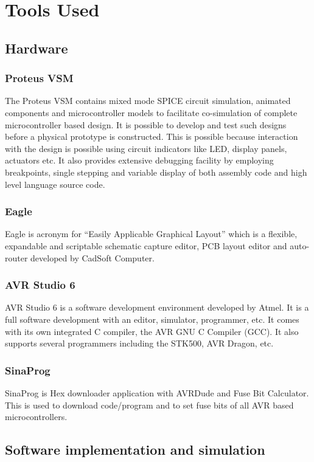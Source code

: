 \documentclass[12pt, a4paper]{article}
\begin{document}
\newpage
\section{Tools Used}

\subsection{ Hardware}
\subsubsection{Proteus VSM}
The Proteus VSM contains mixed mode SPICE circuit simulation, animated components and microcontroller models to facilitate co-simulation of complete microcontroller based design. It is possible to develop and test such designs before a physical prototype is constructed. This is possible because interaction with the design is possible using circuit indicators like LED, display panels, actuators etc. It also provides extensive debugging facility by employing breakpoints, single stepping and variable display of both assembly code and high level language source code.

\subsubsection{Eagle}
Eagle is acronym for “Easily Applicable Graphical Layout” which is a flexible, expandable and scriptable schematic capture editor, PCB layout editor and auto-router developed by CadSoft Computer. 

\subsubsection {AVR Studio 6}
AVR Studio 6 is a software development environment developed by Atmel. It is a full software development with an editor, simulator, programmer, etc. It comes with its own integrated C compiler, the AVR GNU C Compiler (GCC). It also supports several programmers including the STK500, AVR Dragon, etc. 

\subsubsection{SinaProg}
SinaProg is Hex downloader application with AVRDude and Fuse Bit Calculator. This is used to download code/program and to set fuse bits of all AVR based microcontrollers. 

\subsection{Software implementation and simulation}
\end{document}
